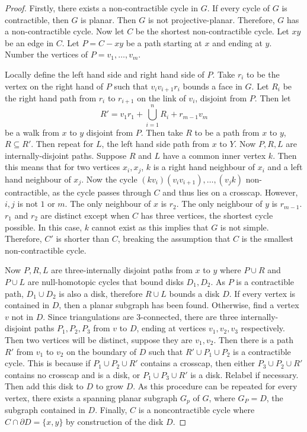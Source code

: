 \begin{proof}
     Firstly, there exists a non-contractible cycle in $G$. If every cycle of $G$ is contractible, then $G$ is planar. Then $G$ is not projective-planar. Therefore, $G$ has a non-contractible cycle. Now let $C$ be the shortest non-contractible cycle. Let $xy$ be an edge in $C$. Let $P = C - xy$ be a path starting at $x$ and ending at $y$. 
    Number the vertices of $P = v_1, \ldots, v_m$. 

    Locally define the left hand side and right hand side of $P$. Take $r_i$ to be the vertex on the right hand of $P$ such that $v_i v_{i + 1} r_i$ bounds a face in $G$. Let $R_i$ be the right hand path from $r_i$ to $r_{i + 1}$ on the link of $v_i$, disjoint from $P$. Then let 
    \begin{equation*}
        R' = v_1 r_1 + \bigcup_{i = 1}^n R_i + r_{m-1} v_m
    \end{equation*}
    be a walk from $x$ to $y$ disjoint from $P$. Then take $R$ to be a path from $x$ to $y$, $R \subseteq R'$. Then repeat for $L$, the left hand side path from $x$ to $Y$. Now $P, R, L$ are internally-disjoint paths. Suppose $R$ and $L$ have a common inner vertex $k$. Then this means that for two vertices $x_i, x_j$, $k$ is a right hand neighbour of $x_i$ and a left hand neighbour of $x_j$. Now the cycle $(k v_i) (v_i v_{i + 1}), \ldots , (v_j k)$ non-contractible, as the cycle passes through $C$ and thus lies on a crosscap. However, $i, j$ is not $1$ or $m$. The only neighbour of $x$ is $r_2$. The only neighbour of $y$ is $r_{m-1}$. $r_1$ and $r_2$ are distinct except when $C$ has three vertices, the shortest cycle possible. In this case, $k$ cannot exist as this implies that $G$ is not simple. Therefore, $C'$ is shorter than $C$, breaking the assumption that $C$ is the smallest non-contractible cycle.

    Now $P, R, L$ are three-internally disjoint paths from $x$ to $y$ where $P \cup R$ and $P \cup L$ are null-homotopic cycles that bound disks $D_1, D_2$. As $P$ is a contractible path, $D_1 \cup D_2$ is also a disk, therefore $R \cup L$ bounds a disk $D$. If every vertex is contained in $D$, then a planar subgraph has been found. Otherwise, find a vertex $v$ not in $D$. Since triangulations are 3-connected, there are three internally-disjoint paths $P_1, P_2, P_3$ from $v$ to $D$, ending at vertices $v_1, v_2, v_3$ respectively. Then two vertices will be distinct, suppose they are $v_1, v_2$. Then there is a path $R'$ from $v_1$ to $v_2$ on the boundary of $D$ such that $R' \cup P_1 \cup P_2$ is a contractible cycle. This is because if $P_1 \cup P_2 \cup R'$ contains a crosscap, then either $P_3 \cup P_2 \cup R'$ contains no crosscap and is a disk, or $P_1 \cup P_3 \cup R'$ is a disk. Relabel if necessary. Then add this disk to $D$ to grow $D$. As this procedure can be repeated for every vertex, there exists a spanning planar subgraph $G_p$ of $G$, where $G_P = D$, the subgraph contained in $D$. Finally, $C$ is a noncontractible cycle where $C \cap \partial D = \{x, y\}$ by construction of the disk $D$. 
\end{proof}
